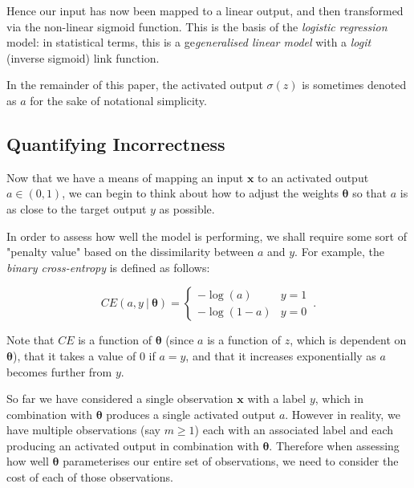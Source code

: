 \documentclass{article}[11pt]
\begin{document}
        Hence our input has now been mapped to a linear output, and then transformed via the non-linear sigmoid function. This is the basis of the \textit{logistic regression} model: in statistical terms, this is a ge\textit{generalised linear model} with a \textit{logit} (inverse sigmoid) link function.
        
        In the remainder of this paper, the activated output $\sigma(z)$ is sometimes denoted as $a$ for the sake of notational simplicity.
        
        
        
    \subsection{Quantifying Incorrectness} \label{sec:costfun}
        
        Now that we have a means of mapping an input $\mathbf{x}$ to an activated output $a \in (0, 1)$, we can begin to think about how to adjust the weights $\boldsymbol{\theta}$ so that $a$ is as close to the target output $y$ as possible.
        
        In order to assess how well the model is performing, we shall require some sort of "penalty value" based on the dissimilarity between $a$ and $y$. For example, the \textit{binary cross-entropy} is defined as follows:
        
        $$
        CE(a, y \ \vert \ \boldsymbol{\theta}) = \begin{cases}
            -\log(a) & y = 1 \\
            -\log(1-a) & y = 0
        \end{cases} \,.
        $$        
        
        Note that $CE$ is a function of $\boldsymbol{\theta}$ (since $a$ is a function of $z$, which is dependent on $\boldsymbol{\theta}$), that it takes a value of 0 if $a = y$, and that it increases exponentially as $a$ becomes further from $y$.
        
        So far we have considered a single observation $\mathbf{x}$ with a label $y$, which in combination with $\boldsymbol{\theta}$ produces a single activated output $a$. However in reality, we have multiple observations (say $m \geq 1$) each with an associated label and each producing an activated output in combination with $\boldsymbol{\theta}$. Therefore when assessing how well $\boldsymbol{\theta}$ parameterises our entire set of observations, we need to consider the cost of each of those observations.
        
\end{document}
